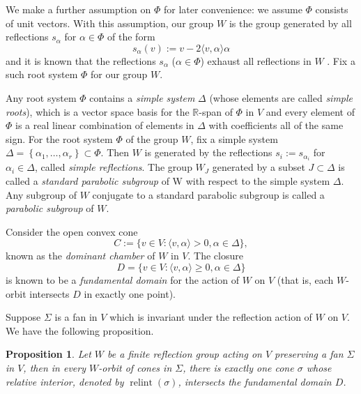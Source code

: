 \documentclass{amsart}
\newtheorem{proposition}[theorem]{Proposition}
\theoremstyle{definition}
\theoremstyle{remark}
\numberwithin{equation}{section}
\begin{document}
We make a further assumption on $\Phi$ for later convenience: we assume $\Phi$ consists of unit vectors. With this assumption, our group $W$ is the group generated by all 
reflections $s_\alpha$ for $\alpha \in \Phi$ of the form 
\begin{equation} \label{eq-reflection}
s_\alpha(v):=v-2 \langle v, \alpha\rangle \alpha
\end{equation}
and it is known that the reflections $s_\alpha$ ($\alpha \in \Phi$) exhaust all reflections in $W$ \cite[Proposition 1.14]{Humphreys90}. Fix a such root system $\Phi$ for our group $W$.

Any root system $\Phi$ contains a \emph{simple system} $\Delta$ (whose elements are called \emph{simple roots}), which is a vector space basis for the $\mathbb{R}$-span of $\Phi$ in $V$ and every element of $\Phi$ is a real linear combination of elements in $\Delta$ with coefficients all of the same sign. For the root system $\Phi$ of the group $W$, fix a simple system $\Delta=\left\{\alpha_1, \ldots, \alpha_r\right\} \subset \Phi$. Then $W$ is generated by the reflections $s_i:=s_{\alpha_i}$ for $\alpha_i \in \Delta$, called \emph{simple reflections}. The group $W_J$ generated by a subset $J \subset \Delta$ is called a \emph{standard parabolic subgroup} of W with respect to the simple system $\Delta$. Any subgroup of $W$ conjugate to a standard parabolic subgroup is called a \emph{parabolic subgroup} of $W$.

Consider the open convex cone
$$
C:=\{v \in V:\langle v, \alpha\rangle > 0, \alpha \in \Delta\},
$$
known as the \emph{dominant chamber} of $W$ in $V$. The closure 
$$
D=\{v \in V:\langle v, \alpha\rangle \geq 0, \alpha \in \Delta\}
$$ is known to be a \emph{fundamental domain} for the action of $W$ on $V$ (that is, each $W$-orbit intersects $D$ in exactly one point).

Suppose $\Sigma$ is a fan in $V$ which is invariant under the reflection action of $W$ on $V$. We have the following proposition.

\begin{proposition} \label{prop-unique}
Let $W$ be a finite reflection group acting on $V$ preserving a fan $\Sigma$ in $V$, then in every $W$-orbit of cones in $\Sigma$, there is exactly one cone $\sigma$ whose relative interior, denoted by $\operatorname{relint}(\sigma)$, intersects the fundamental domain $D$.
\end{proposition}
\end{document}
